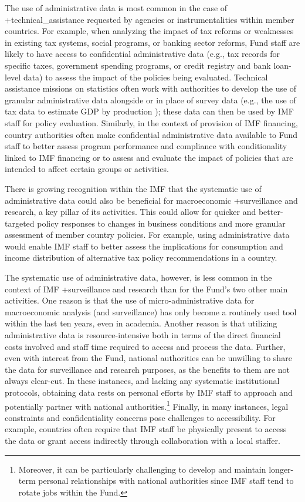 \documentclass[
]{WileySix}
\begin{document}
The use of administrative data is most common in the case of +technical\_assistance\textbar{} requested by agencies or instrumentalities within member countries. For example, when analyzing the impact of tax reforms or weaknesses in existing tax systems, social programs, or banking sector reforms, Fund staff are likely to have access to confidential administrative data (e.g., tax records for specific taxes, government spending programs, or credit registry and bank loan-level data) to assess the impact of the policies being evaluated. Technical assistance missions on statistics often work with authorities to develop the use of granular administrative data alongside or in place of survey data (e.g., the use of tax data to estimate GDP by production \citep{rivas2018}); these data can then be used by IMF staff for policy evaluation. Similarly, in the context of provision of IMF financing, country authorities often make confidential administrative data available to Fund staff to better assess program performance and compliance with conditionality linked to IMF financing or to assess and evaluate the impact of policies that are intended to affect certain groups or activities.

There is growing recognition within the IMF that the systematic use of administrative data could also be beneficial for macroeconomic +surveillance\textbar{} and research, a key pillar of its activities. This could allow for quicker and better-targeted policy responses to changes in business conditions and more granular assessment of member country policies. For example, using administrative data would enable IMF staff to better assess the implications for consumption and income distribution of alternative tax policy recommendations in a country.

The systematic use of administrative data, however, is less common in the context of IMF +surveillance\textbar{} and research than for the Fund's two other main activities. One reason is that the use of micro-administrative data for macroeconomic analysis (and surveillance) has only become a routinely used tool within the last ten years, even in academia. Another reason is that utilizing administrative data is resource-intensive both in terms of the direct financial costs involved and staff time required to access and process the data. Further, even with interest from the Fund, national authorities can be unwilling to share the data for surveillance and research purposes, as the benefits to them are not always clear-cut. In these instances, and lacking any systematic institutional protocols, obtaining data rests on personal efforts by IMF staff to approach and potentially partner with national authorities.\footnote{Moreover, it can be particularly challenging to develop and maintain longer-term personal relationships with national authorities since IMF staff tend to rotate jobs within the Fund.} Finally, in many instances, legal constraints and confidentiality concerns pose challenges to accessibility. For example, countries often require that IMF staff be physically present to access the data or grant access indirectly through collaboration with a local staffer.
\end{document}
